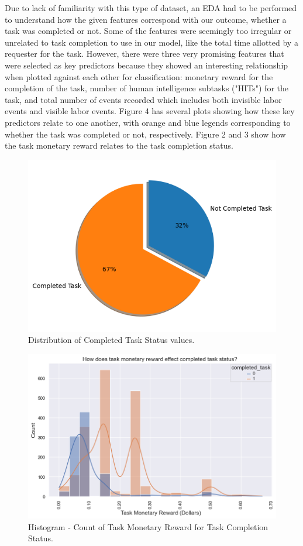 \documentclass[11pt]{article}
\begin{document}
Due to lack of familiarity with this type of dataset, an EDA had to be performed to understand how the given features correspond with our outcome, whether a task was completed or not. Some of the features were seemingly too irregular or unrelated to task completion to use in our model, like the total time allotted by a requester for the task. However, there were three very promising features that were selected as key predictors because they showed an interesting relationship when plotted against each other for classification: monetary reward for the completion of the task, number of human intelligence subtasks ("HITs") for the task, and total number of events recorded which includes both invisible labor events and visible labor events. Figure 4 has several plots showing how these key predictors relate to one another, with orange and blue legends corresponding to whether the task was completed or not, respectively. Figure 2 and 3 show how the task monetary reward relates to the task completion status.

\begin{figure}[hbt!]
  \centering
  \includegraphics[width=330pt]{figures/distribution-completed-tasks-pie-chart}
  \caption{Distribution of Completed Task Status values.}
\end{figure}

\begin{figure}[hbt!]
  \centering
  \includegraphics[width=450pt]{figures/task-monetary_reward_in_dollars-vs-completed_task-histogram}
  \caption{Histogram - Count of Task Monetary Reward for Task Completion Status.}
\end{figure}
\end{document}
